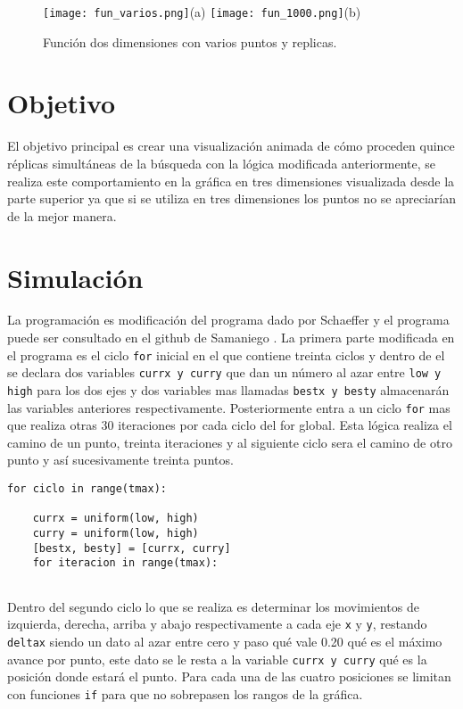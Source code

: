 \documentclass[a4paper, 11pt]{article}
\begin{document}
\begin{figure}[H]
    \centering 
    \texttt{[image: fun\_varios.png]}(a)
    \texttt{[image: fun\_1000.png]}(b)
    \caption{Función dos dimensiones con varios puntos y replicas.}
    \label{f4}
\end{figure}

\section{Objetivo}

El objetivo principal es crear una visualización animada de cómo proceden quince réplicas simultáneas de la búsqueda con la lógica modificada anteriormente, se realiza este comportamiento en la gráfica en tres dimensiones visualizada desde la parte superior ya que si se utiliza en tres dimensiones los puntos no se apreciarían de la mejor manera.

\section{Simulación}
La programación es modificación del programa dado por Schaeffer \cite{elisa} y el programa puede ser consultado en el github de Samaniego \cite{Edson}.
La primera parte modificada en el programa es el ciclo \texttt{for} inicial en el que contiene treinta ciclos y dentro de el se declara dos variables \texttt{currx y curry} que dan un número al azar entre \texttt{low y high} para los dos ejes y dos variables mas llamadas \texttt{bestx y besty} almacenarán las variables anteriores respectivamente. Posteriormente entra a un ciclo \texttt{for} mas que realiza otras 30 iteraciones por cada ciclo del for global. Esta lógica realiza el camino de un punto, treinta iteraciones y al siguiente ciclo sera el camino de otro punto y así sucesivamente treinta puntos.

\begin{verbatim}
for ciclo in range(tmax):
    
    currx = uniform(low, high)
    curry = uniform(low, high)
    [bestx, besty] = [currx, curry]
    for iteracion in range(tmax):
    
\end{verbatim}

Dentro del segundo ciclo lo que se realiza es determinar los movimientos de izquierda, derecha, arriba y abajo respectivamente a cada eje \texttt{x} y \texttt{y}, restando \texttt{deltax} siendo un dato al azar entre cero y paso qué vale 0.20 qué es el máximo avance por punto, este dato se le resta a la variable \texttt{currx y curry} qué es la posición donde estará el punto. 
Para cada una de las cuatro posiciones se limitan con funciones \texttt{if} para que no sobrepasen los rangos de la gráfica. 
\end{document}
